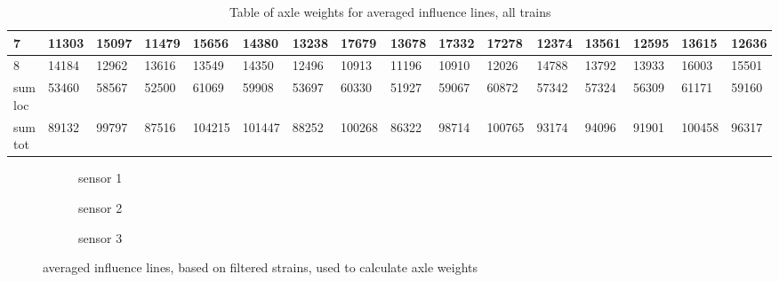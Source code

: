 \begin{sidewaystable}[htpb]
{\begin{tabularx}{\textheight}{ |l|X|X|X|X|X|X|X|X|X|X|X|X|X|X|X| }
      \hline
      7 & 11303   &   15097   &    11479   &    15656   &    14380    &   13238  &     17679    &   13678   &    17332   &    17278   &    12374   &    13561    &   12595   &   13615    &    12636  \\
      \hline
      8 & 14184   &   12962   &    13616   &    13549   &    14350    &   12496  &     10913    &   11196   &    10910   &    12026   &    14788   &    13792    &   13933   &   16003    &    15501  \\
      \hline
      sum loc & 53460   &   58567   &    52500   &    61069   &    59908    &   53697  &     60330    &   51927   &    59067   &    60872   &    57342   &    57324    &   56309   &   61171    &    59160  \\
      \bottomrule
      sum tot & 89132 & 99797 & 87516 & 104215 & 101447 & 88252 & 100268 & 86322 & 98714 & 100765 & 93174 & 94096 & 91901 & 100458 & 96317  \\
      \bottomrule
    \end{tabularx}}
	\caption{Table of axle weights for averaged influence lines, all trains}
	\label{table:all_trains_all sensors}
\end{sidewaystable}
\begin{figure}[h!]
	\begin{subfigure}[t]{0.8\textwidth}
		
		\caption{sensor 1}
		\label{fig:sensor1_averaged}
	\end{subfigure}
	\begin{subfigure}[t]{0.8\textwidth}
		
		\caption{sensor 2}
		\label{fig:sensor2_averaged}
	\end{subfigure}
	\begin{subfigure}[t]{0.8\textwidth}
		
		\caption{sensor 3}
		\label{fig:sensor3_averaged}
	\end{subfigure}
	\caption{averaged influence lines, based on filtered strains, used to calculate axle weights}
	\label{averaged_filtered_infl_lines}
\end{figure}
